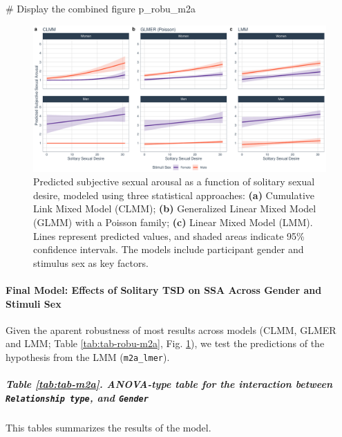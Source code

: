 \documentclass[
  bookmarksnumbered]{article}
\newenvironment{Shaded}{\begin{snugshade}}{\end{snugshade}}
\newcommand{\CommentTok}[1]{\textcolor[rgb]{0.50,0.62,0.50}{#1}}
\newcommand{\NormalTok}[1]{\textcolor[rgb]{0.80,0.80,0.80}{#1}}
\begin{document}
\begin{Shaded}
\begin{Highlighting}[]
\CommentTok{\# Display the combined figure}
\NormalTok{p\_robu\_m2a}
\end{Highlighting}
\end{Shaded}

\begin{figure}
\centering
\includegraphics{Sexual_Desire_Arousal_V2_files/figure-latex/preds-m2a-1.pdf}
\caption{\label{fig:preds-m2a}Predicted subjective sexual arousal as a function of solitary sexual desire, modeled using three statistical approaches: \textbf{(a)} Cumulative Link Mixed Model (CLMM); \textbf{(b)} Generalized Linear Mixed Model (GLMM) with a Poisson family; \textbf{(c)} Linear Mixed Model (LMM). Lines represent predicted values, and shaded areas indicate 95\% confidence intervals. The models include participant gender and stimulus sex as key factors.}
\end{figure}

\paragraph{Final Model: Effects of Solitary TSD on SSA Across Gender and Stimuli Sex}\label{final-model-effects-of-solitary-tsd-on-ssa-across-gender-and-stimuli-sex}

Given the aparent robustness of most results across models (CLMM, GLMER and LMM; Table \ref{tab:tab-robu-m2a}, Fig. \ref{fig:preds-m2a}), we test the predictions of the hypothesis from the LMM (\texttt{m2a\_lmer}).

\subparagraph{\texorpdfstring{Table \ref{tab:tab-m2a}. ANOVA-type table for the interaction between \texttt{Relationship\ type}, and \texttt{Gender}}{Table \ref{tab:tab-m2a}. ANOVA-type table for the interaction between Relationship type, and Gender}}\label{table-reftabtab-m2a.-anova-type-table-for-the-interaction-between-relationship-type-and-gender}

This tables summarizes the results of the model.
\end{document}
